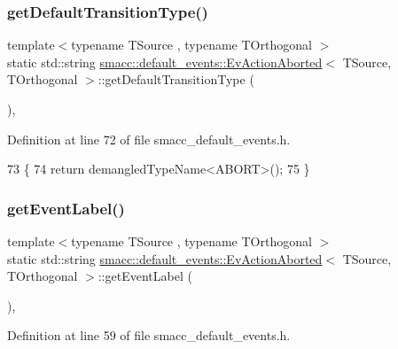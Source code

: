 \subsubsection{\texorpdfstring{get\+Default\+Transition\+Type()}{getDefaultTransitionType()}}
{\footnotesize\ttfamily template$<$typename T\+Source , typename T\+Orthogonal $>$ \\
static std\+::string \hyperlink{structsmacc_1_1default__events_1_1EvActionAborted}{smacc\+::default\+\_\+events\+::\+Ev\+Action\+Aborted}$<$ T\+Source, T\+Orthogonal $>$\+::get\+Default\+Transition\+Type (\begin{DoxyParamCaption}{ }\end{DoxyParamCaption})\hspace{0.3cm}{\ttfamily [inline]}, {\ttfamily [static]}}



Definition at line 72 of file smacc\+\_\+default\+\_\+events.\+h.


\begin{DoxyCode}
73   \{
74     \textcolor{keywordflow}{return} demangledTypeName<ABORT>();
75   \}
\end{DoxyCode}
\mbox{\label{structsmacc_1_1default__events_1_1EvActionAborted_ad30b3aabae46c54eb4ee9944d6427a56}} 
\subsubsection{\texorpdfstring{get\+Event\+Label()}{getEventLabel()}}
{\footnotesize\ttfamily template$<$typename T\+Source , typename T\+Orthogonal $>$ \\
static std\+::string \hyperlink{structsmacc_1_1default__events_1_1EvActionAborted}{smacc\+::default\+\_\+events\+::\+Ev\+Action\+Aborted}$<$ T\+Source, T\+Orthogonal $>$\+::get\+Event\+Label (\begin{DoxyParamCaption}{ }\end{DoxyParamCaption})\hspace{0.3cm}{\ttfamily [inline]}, {\ttfamily [static]}}



Definition at line 59 of file smacc\+\_\+default\+\_\+events.\+h.


